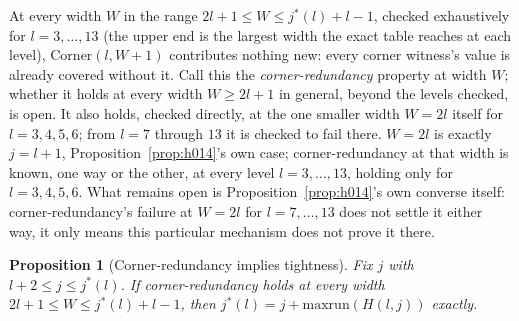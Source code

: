 \documentclass[11pt]{amsart}
\theoremstyle{plain}
\newtheorem{proposition}[theorem]{Proposition}
\theoremstyle{definition}
\theoremstyle{remark}
\begin{document}
At every width $W$ in the range $2l+1\le W\le j^*(l)+l-1$,
checked exhaustively for $l=3,\dots,13$ (the upper end is the largest width the exact table reaches
at each level), $\mathrm{Corner}(l,W+1)$ contributes nothing new: every corner witness's value is
already covered without it. Call this the \emph{corner-redundancy} property at width $W$; whether it
holds at every width $W\ge2l+1$ in general, beyond the levels checked, is open. It also holds,
checked directly, at the one smaller width $W=2l$ itself for $l=3,4,5,6$; from $l=7$ through $13$ it
is checked to fail there. $W=2l$ is exactly $j=l+1$,
Proposition~\ref{prop:h014}'s own
case; corner-redundancy at that width is known, one way or the other, at every level $l=3,\dots,13$,
holding only for $l=3,4,5,6$. What remains open is Proposition~\ref{prop:h014}'s own converse itself:
corner-redundancy's failure at $W=2l$ for $l=7,\dots,13$ does not settle it either way, it only means this
particular mechanism does not prove it there.

\begin{proposition}[Corner-redundancy implies tightness]
\label{prop:tight}
Fix $j$ with $l+2\le j\le j^*(l)$. If corner-redundancy holds at every width $2l+1\le W\le
j^*(l)+l-1$, then $j^*(l)=j+\mathrm{maxrun}(H(l,j))$ exactly.
\end{proposition}
\end{document}
